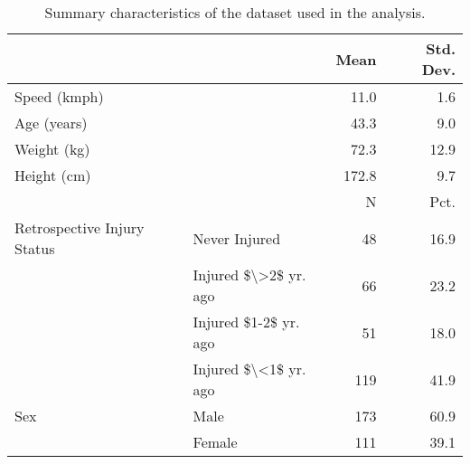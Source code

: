 \begin{table}

\caption{Summary characteristics of the dataset used in the analysis.}
\centering
\begin{tabular}[t]{llrr}
\toprule
  &    & Mean & Std. Dev.\\
\midrule
Speed (kmph) &  & 11.0 & 1.6\\
Age (years) &  & 43.3 & 9.0\\
Weight (kg) &  & 72.3 & 12.9\\
Height (cm) &  & 172.8 & 9.7\\
\midrule
 &  & N & Pct.\\
Retrospective Injury Status & Never Injured & 48 & 16.9\\
 & Injured \$\textbackslash{}>2\$ yr. ago & 66 & 23.2\\
 & Injured \$1-2\$ yr. ago & 51 & 18.0\\
 & Injured \$\textbackslash{}<1\$ yr. ago & 119 & 41.9\\
Sex & Male & 173 & 60.9\\
 & Female & 111 & 39.1\\
\bottomrule
\end{tabular}
\end{table}
